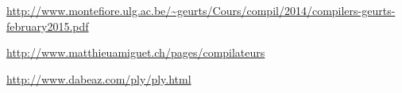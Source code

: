 \documentclass[12pt,a4paper]{article}
\begin{document}
\clearpage
\begin{thebibliography}{9}

\url{http://www.montefiore.ulg.ac.be/\~geurts/Cours/compil/2014/compilers-geurts-february2015.pdf}

\url{http://www.matthieuamiguet.ch/pages/compilateurs}

\url{http://www.dabeaz.com/ply/ply.html}


\end{thebibliography}
\end{document}
